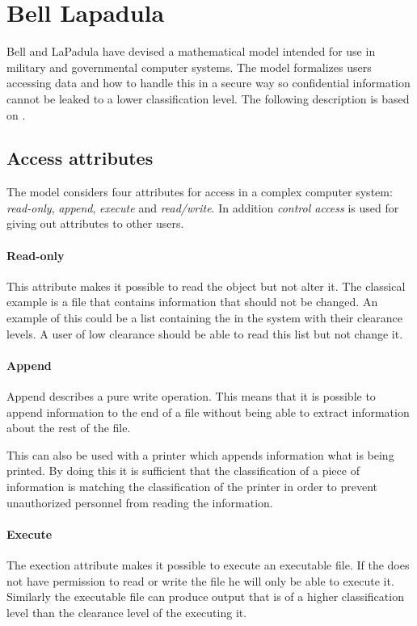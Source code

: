 \section{Bell Lapadula}

Bell and LaPadula have devised a mathematical model intended for use in  military and governmental computer systems.
The model formalizes users accessing data and how to handle this in a secure way so confidential information cannot be leaked to a lower classification level.
The following description is based on \citet{lapadula1996secure}.

\subsection{Access attributes}
The model considers four attributes for access in a complex computer system: \emph{read-only}, \emph{append}, \emph{execute} and \emph{read/write}.
In addition \emph{control access} is used for giving out attributes to other users.

\paragraph{Read-only}
This attribute makes it possible to read the object but not alter it.
The classical example is a file that contains information that should not be changed.
An example of this could be a list containing the \principals{} in the system with their clearance levels.
A user of low clearance should be able to read this list but not change it.

\paragraph{Append}
Append describes a pure write operation.
This means that it is possible to append information to the end of a file without being able to extract information about the rest of the file.

This can also be used with a printer which appends information what is being printed.
By doing this it is sufficient that the classification of a piece of information is matching the classification of the printer in order to prevent unauthorized personnel from reading the information.

\paragraph{Execute}
The exection attribute makes it possible to execute an executable file.
If the \principal{} does not have permission to read or write the file he will only be able to execute it.
Similarly the executable file can produce output that is of a higher classification level than the clearance level of the \principal{} executing it.

